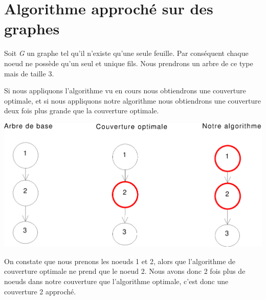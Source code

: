 \section{Algorithme approch\'e sur des graphes}

Soit \textit{G} un graphe tel qu'il n'existe qu'une seule feuille. Par
cons\'equent chaque noeud ne poss\`ede qu'un seul et unique fils. Nous
prendrons un arbre de ce type mais de taille 3.

Si nous appliquons l'algorithme vu en cours nous obtiendrons une
couverture optimale, et si nous appliquons notre algorithme nous
obtiendrons une couverture deux fois plus grande que la couverture optimale.


\bigskip


\includegraphics[width=15cm]{arbredoublecouverture}

On constate que nous prenons les noeuds 1 et 2, alors que l'algorithme
de couverture optimale ne prend que le noeud 2. Nous avons donc 2 fois
plus de noeuds dans notre couverture que l'algorithme optimale, c'est
donc une couverture 2 approch\'e.
